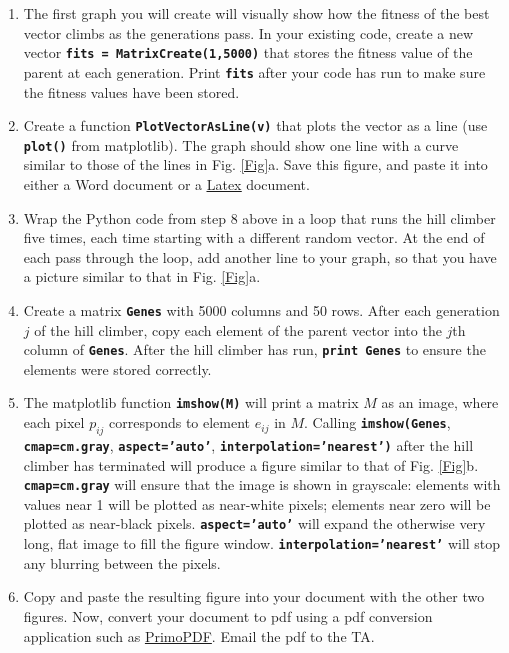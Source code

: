 \documentclass[12pt]{article}
\begin{document}
\begin{enumerate}

\item The first graph you will create will visually show how the fitness of the best vector climbs as the generations pass. In your existing code, create a new vector \textbf{\texttt{fits = MatrixCreate(1,5000)}} that stores the fitness value of the parent at each generation. Print \textbf{\texttt{fits}} after your code has run to make sure the fitness values have been stored.

\item Create a function \textbf{\texttt{PlotVectorAsLine(v)}} that plots the vector as a line (use \textbf{\texttt{plot()}} from matplotlib). The graph should show one line with a curve similar to those of the lines in Fig. \ref{Fig}a. Save this figure, and paste it into either a Word document or a \href{http://www.latex-project.org/}{\underline{Latex}} document.

\item Wrap the Python code from step 8 above in a loop that runs the hill climber five times, each time starting with a different random vector. At the end of each pass through the loop, add another line to your graph, so that you have a picture similar to that in Fig. \ref{Fig}a.

\item Create a matrix \textbf{\texttt{Genes}} with 5000 columns and 50 rows. After each generation $j$ of the hill climber, copy each element of the parent vector into the $j$th column of \textbf{\texttt{Genes}}. After the hill climber has run, \textbf{\texttt{print Genes}} to ensure the elements were stored correctly.

\item The matplotlib function \textbf{\texttt{imshow(M)}} will print a matrix $M$ as an image, where each pixel $p_{ij}$ corresponds to element $e_{ij}$ in $M$. Calling \textbf{\texttt{imshow(Genes}}, \textbf{\texttt{cmap=cm.gray}}, \textbf{\texttt{aspect='auto'}}, \textbf{\texttt{interpolation='nearest')}} after the hill climber has terminated will produce a figure similar to that of Fig. \ref{Fig}b. \textbf{\texttt{cmap=cm.gray}} will ensure that the image is shown in grayscale: elements with values near 1 will be plotted as near-white pixels; elements near zero will be plotted as near-black pixels. \textbf{\texttt{aspect='auto'}} will expand the otherwise very long, flat image to fill the figure window. \textbf{\texttt{interpolation='nearest'}} will stop any blurring between the pixels.

\item Copy and paste the resulting figure into your document with the other two figures. Now, convert your document to pdf using a pdf conversion application such as \href{http://www.primopdf.com/index.aspx}{PrimoPDF}. Email the pdf to the TA.

\end{enumerate}
\end{document}
